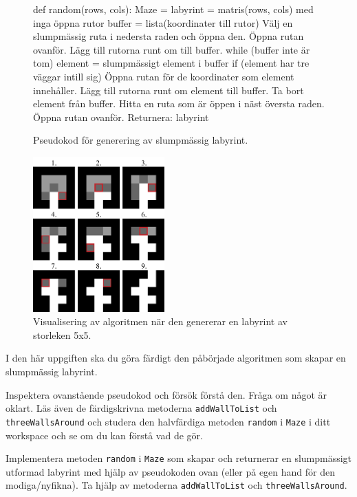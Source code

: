 \begin{figure}[H]
\begin{Code}
def random(rows, cols): Maze = {
	labyrint = matris(rows, cols) med inga öppna rutor
	buffer = lista(koordinater till rutor)
	Välj en slumpmässig ruta i nedersta raden och öppna den.
	Öppna rutan ovanför.
	Lägg till rutorna runt om till buffer.
	while (buffer inte är tom)
		element = slumpmässigt element i buffer
		if (element har tre väggar intill sig)
			Öppna rutan för de koordinater som element innehåller.
			Lägg till rutorna runt om element till buffer.
		Ta bort element från buffer.
	Hitta en ruta som är öppen i näst översta raden.
	Öppna rutan ovanför.
	Returnera: labyrint 
}
\end{Code}
	\caption{Pseudokod för generering av slumpmässig labyrint.}
	\label{lab:maze:prims-algo}
\end{figure}


\begin{figure}[H]
	\begin{center}
		\includegraphics[width=0.45\textwidth]{../img/w09-lab/AlgorithmVisualized.png}
	\end{center}
	\caption{Visualisering av algoritmen när den genererar en labyrint av storleken 5x5.}
	\label{lab:maze:prims-algo-viz}
\end{figure}


\Task I den här uppgiften ska du göra färdigt den påbörjade algoritmen som skapar en slumpmässig labyrint.

\Subtask Inspektera ovanstående pseudokod och försök förstå den. Fråga om något är oklart. Läs även de färdigskrivna metoderna \texttt{addWallToList} och \texttt{threeWallsAround} och studera den halvfärdiga metoden \texttt{random} i \texttt{Maze} i ditt workspace och se om du kan förstå vad de gör.

\Subtask Implementera metoden \texttt{random} i \texttt{Maze} som skapar och returnerar en slumpmässigt utformad labyrint med hjälp av pseudokoden ovan (eller på egen hand för den modiga/nyfikna). Ta hjälp av metoderna \texttt{addWallToList} och \texttt{threeWallsAround}.

